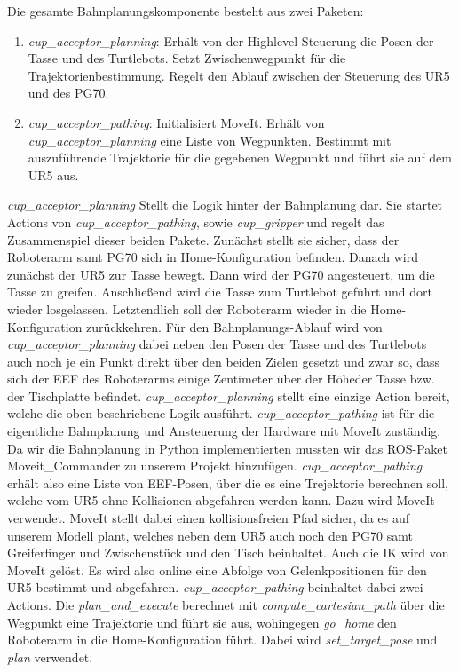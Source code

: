 Die gesamte Bahnplanungskomponente besteht aus zwei Paketen:
\begin{enumerate}
	\item \textit{cup\_acceptor\_planning}:
				\newline
				Erhält von der Highlevel-Steuerung die Posen der Tasse und des Turtlebots. Setzt Zwischenwegpunkt für die Trajektorienbestimmung. Regelt den Ablauf zwischen der Steuerung des UR5 und des PG70.
	\item \textit{cup\_acceptor\_pathing}:
				\newline
				Initialisiert MoveIt. Erhält von \textit{cup\_acceptor\_planning} eine Liste von Wegpunkten. Bestimmt mit auszuführende Trajektorie für die gegebenen Wegpunkt und führt sie auf dem UR5 aus.
\end{enumerate}
\textit{cup\_acceptor\_planning} Stellt die Logik hinter der Bahnplanung dar. Sie startet Actions von \textit{cup\_acceptor\_pathing}, sowie \textit{cup\_gripper} und regelt das Zusammenspiel dieser beiden Pakete. Zunächst stellt sie sicher, dass der Roboterarm samt PG70 sich in Home-Konfiguration befinden. Danach wird zunächst der UR5 zur Tasse bewegt. Dann wird der PG70 angesteuert, um die Tasse zu greifen. Anschließend wird die Tasse zum Turtlebot geführt und dort wieder losgelassen. Letztendlich soll der Roboterarm wieder in die Home-Konfiguration zurückkehren. Für den Bahnplanungs-Ablauf wird von \textit{cup\_acceptor\_planning} dabei neben den Posen der Tasse und des Turtlebots auch noch je ein Punkt direkt über den beiden Zielen gesetzt und zwar so, dass sich der EEF des Roboterarms einige Zentimeter über der Höheder Tasse bzw. der Tischplatte befindet. \textit{cup\_acceptor\_planning} stellt eine einzige Action bereit, welche die oben beschriebene Logik ausführt. 
\newline
\textit{cup\_acceptor\_pathing} ist für die eigentliche Bahnplanung und Ansteuerung der Hardware mit MoveIt zuständig. Da wir die Bahnplanung in Python implementierten mussten wir das ROS-Paket \glqq Moveit\_Commander\grqq \cite{MoveItCommander} zu unserem Projekt hinzufügen. \textit{cup\_acceptor\_pathing} erhält also eine Liste von EEF-Posen, über die es eine Trejektorie berechnen soll, welche vom UR5 ohne Kollisionen abgefahren werden kann. Dazu wird MoveIt verwendet. MoveIt stellt dabei einen kollisionsfreien Pfad sicher, da es auf unserem Modell plant, welches neben dem UR5 auch noch den PG70 samt Greiferfinger und Zwischenstück und den Tisch beinhaltet. Auch die IK wird von MoveIt gelöst. Es wird also online eine Abfolge von Gelenkpositionen für den UR5 bestimmt und abgefahren. \textit{cup\_acceptor\_pathing} beinhaltet dabei zwei Actions. Die \textit{plan\_and\_execute} berechnet mit \textit{compute\_cartesian\_path} über die Wegpunkt eine Trajektorie und führt sie aus, wohingegen \textit{go\_home} den Roboterarm in die Home-Konfiguration führt. Dabei wird \textit{set\_target\_pose} und \textit{plan} verwendet.
